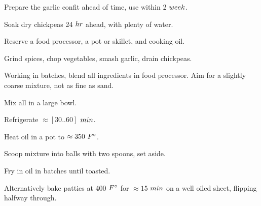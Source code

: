 \begin{preparation}
\item Prepare the garlic confit ahead of time, use within 2 $\week$.

\item Soak dry chickpeas 24 $\hour$ ahead, with plenty of water.

\item Reserve a food processor, a pot or skillet, and cooking oil.

\item Grind spices, chop vegetables, smash garlic, drain chickpeas.


\item Working in batches, blend all ingredients in food processor.
	Aim for a slightly coarse mixture, not as fine as sand.

\item Mix all in a large bowl.

\item Refrigerate $\approx [30 .. 60]$ $\minute$.

\item Heat oil in a pot to $\approx 350~\Fahrenheit$.

\item Scoop mixture into balls with two spoons, set aside.

\item Fry in oil in batches until toasted.

\end{preparation}


\begin{variation}
\item Alternatively bake patties at 400 $\Fahrenheit$ for $\approx 15$ $\minute$ on a well oiled sheet, flipping halfway through.

\end{variation}


\recipeend%
